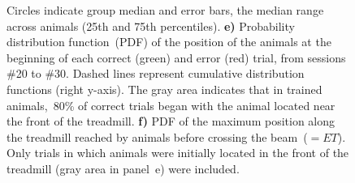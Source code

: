 \begin{figure}[bt!]
\begin{center}
{      Circles indicate group median and error bars, the median range across animals (25th and 75th percentiles).
      \textbf{e)}
      Probability distribution function~(PDF) of the position of the animals at the beginning of each correct (green) and error (red) trial, from sessions \#20 to \#30.
      Dashed lines represent cumulative distribution functions (right y-axis).
      The gray area indicates that in trained animals,~80\% of correct trials began with the animal located near the front of the treadmill.
      \textbf{f)}
      PDF of the maximum position along the treadmill reached by animals before crossing the beam~($=ET$).
      Only trials in which animals were initially located in the front of the treadmill (gray area in panel~e) were included.
    }
    \label{fig:time:CtrlTrd}
    \end{center}
  \end{figure}